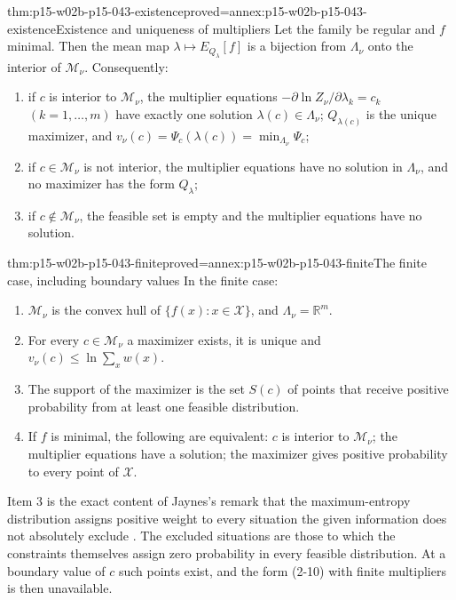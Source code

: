 \begin{hbtheorem}{thm:p15-w02b-p15-043-existence}{proved=annex:p15-w02b-p15-043-existence}{Existence and uniqueness of multipliers}
Let the family be regular and \(f\) minimal. Then the mean map
\(\lambda\mapsto E_{Q_\lambda}[f]\) is a bijection from \(\Lambda_\nu\)
onto the interior of \(\mathcal M_\nu\). Consequently:
\begin{enumerate}
\item if \(c\) is interior to \(\mathcal M_\nu\), the multiplier equations
\(-\partial\ln Z_\nu/\partial\lambda_k=c_k\) \((k=1,\ldots,m)\) have exactly
one solution \(\lambda(c)\in\Lambda_\nu\); \(Q_{\lambda(c)}\) is the unique
maximizer, and
\(v_\nu(c)=\Psi_c(\lambda(c))=\min_{\Lambda_\nu}\Psi_c\);
\item if \(c\in\mathcal M_\nu\) is not interior, the multiplier equations
have no solution in \(\Lambda_\nu\), and no maximizer has the form
\(Q_\lambda\);
\item if \(c\notin\mathcal M_\nu\), the feasible set is empty and the
multiplier equations have no solution.
\end{enumerate}
\end{hbtheorem}

\begin{hbtheorem}{thm:p15-w02b-p15-043-finite}{proved=annex:p15-w02b-p15-043-finite}{The finite case, including boundary values}
In the finite case:
\begin{enumerate}
\item \(\mathcal M_\nu\) is the convex hull of \(\{f(x):x\in\mathcal X\}\),
and \(\Lambda_\nu=\mathbb R^m\).
\item For every \(c\in\mathcal M_\nu\) a maximizer exists, it is unique and
\(v_\nu(c)\leq\ln\sum_xw(x)\).
\item The support of the maximizer is the set
\(S(c)\) of points that receive positive probability from at least one
feasible distribution.
\item If \(f\) is minimal, the following are equivalent: \(c\) is interior to
\(\mathcal M_\nu\); the multiplier equations have a solution; the
maximizer gives positive probability to every point of \(\mathcal X\).
\end{enumerate}
\end{hbtheorem}

Item 3 is the exact content of Jaynes's remark that the maximum-entropy
distribution assigns positive weight to every situation the given information
does not absolutely exclude \cite[p.~623]{Jaynes1957InformationTheory}.
The excluded situations are those to which the constraints themselves assign
zero probability in every feasible distribution. At a boundary value of
\(c\) such points exist, and the form (2-10) with finite multipliers is then
unavailable.

